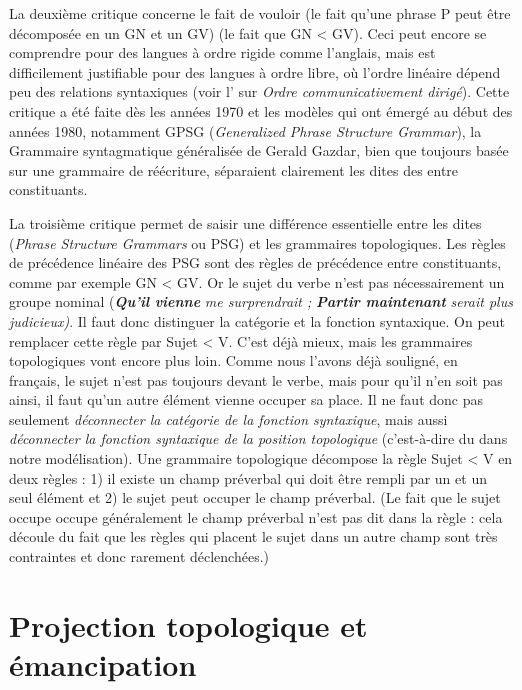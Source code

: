 {    La deuxième critique concerne le fait de vouloir  (le fait qu’une phrase P peut être décomposée en un GN et un GV)  (le fait que GN < GV). Ceci peut encore se comprendre pour des langues à ordre rigide comme l’anglais, mais est difficilement justifiable pour des langues à ordre libre, où l’ordre linéaire dépend peu des relations syntaxiques (voir l’ sur \textit{Ordre communicativement dirigé}). Cette critique a été faite dès les années 1970 et les modèles qui ont émergé au début des années 1980, notamment GPSG (\textit{Generalized Phrase Structure Grammar}), la Grammaire syntagmatique généralisée de Gerald Gazdar, bien que toujours basée sur une grammaire de réécriture, séparaient clairement les  dites  des  entre constituants.

    La troisième critique permet de saisir une différence essentielle entre les  dites  (\textit{Phrase Structure Grammars} ou PSG) et les grammaires topologiques. Les règles de précédence linéaire des PSG sont des règles de précédence entre constituants, comme par exemple GN < GV. Or le sujet du verbe n’est pas nécessairement un groupe nominal (\textbf{\textit{Qu’il} \textit{vienne}} \textit{me surprendrait ;} \textbf{\textit{Partir maintenant}} \textit{serait plus judicieux)}. Il faut donc distinguer la catégorie et la fonction syntaxique. On peut remplacer cette règle par Sujet < V. C’est déjà mieux, mais les grammaires topologiques vont encore plus loin. Comme nous l’avons déjà souligné, en français, le sujet n’est pas toujours devant le verbe, mais pour qu’il n’en soit pas ainsi, il faut qu’un autre élément vienne occuper sa place. Il ne faut donc pas seulement \textit{{déconnecter} la catégorie de la fonction syntaxique}, mais aussi \textit{déconnecter la {fonction syntaxique} de la position topologique} (c'est-à-dire du  dans notre modélisation). Une grammaire topologique décompose la règle Sujet < V en deux règles : 1) il existe un champ préverbal qui doit être rempli par un et un seul élément et 2) le sujet peut occuper le champ préverbal. (Le fait que le sujet occupe occupe généralement le champ préverbal n'est pas dit dans la règle : cela découle du fait que les règles qui placent le sujet dans un autre champ sont très contraintes et donc rarement déclenchées.)
}
\section{Projection topologique et émancipation}\label{sec:3.5.30}%


